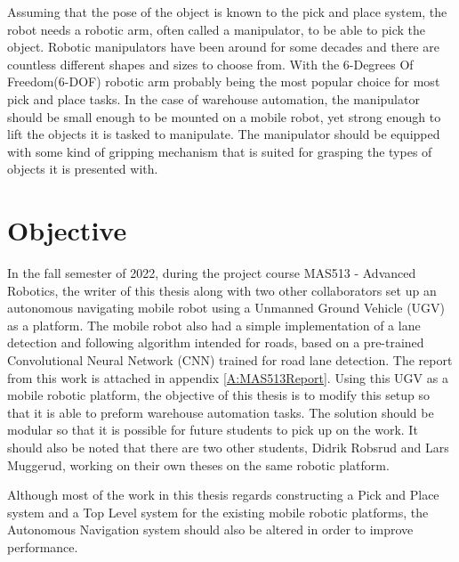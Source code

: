 Assuming that the pose of the object is known to the pick and place system, the robot needs a robotic arm, often called a manipulator, to be able to pick the object. Robotic manipulators have been around for some decades and there are countless different shapes and sizes to choose from. With the 6-Degrees Of Freedom(6-DOF) robotic arm probably being the most popular choice for most pick and place tasks. In the case of warehouse automation, the manipulator should be small enough to be mounted on a mobile robot, yet strong enough to lift the objects it is tasked to manipulate. The manipulator should be equipped with some kind of gripping mechanism that is suited for grasping the types of objects it is presented with.

\section{Objective} \label{sec:I:Objective}
In the fall semester of 2022, during the project course MAS513 - Advanced Robotics, the writer of this thesis along with two other collaborators set up an autonomous navigating mobile robot using a Unmanned Ground Vehicle (UGV) as a platform. The mobile robot also had a simple implementation of a lane detection and following algorithm intended for roads, based on a pre-trained Convolutional Neural Network (CNN) trained for road lane detection. The report from this work is attached in appendix \ref{A:MAS513Report}. Using this UGV as a mobile robotic platform, the objective of this thesis is to modify this setup so that it is able to preform warehouse automation tasks. The solution should be modular so that it is possible for future students to pick up on the work. It should also be noted that there are two other students, Didrik Robsrud and Lars Muggerud, working on their own theses on the same robotic platform.


Although most of the work in this thesis regards constructing a Pick and Place system and a Top Level system for the existing mobile robotic platforms, the Autonomous Navigation system should also be altered in order to improve performance.